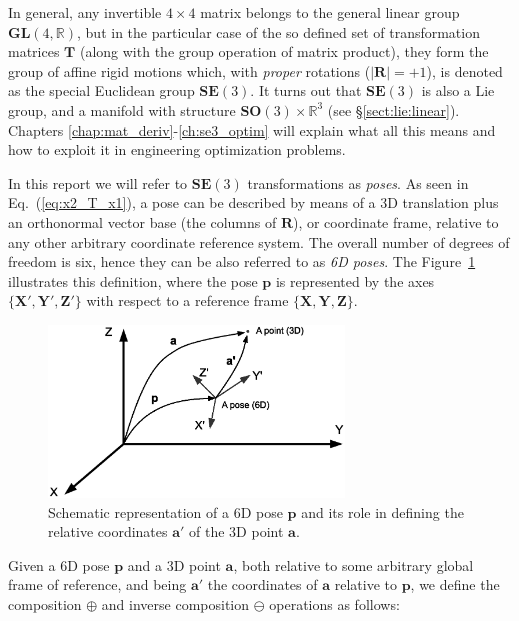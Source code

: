 \documentclass[a4paper,11pt]{report}
\begin{document}
In general, any invertible $4 \times 4$ matrix belongs to the 
general linear group $\mathbf{GL}(4,\mathbb{R})$, but in the particular case of 
the so defined set of transformation matrices $\mathbf{T}$ 
(along with the group operation of matrix product), 
they form the group of affine rigid motions which, with \emph{proper} rotations 
($|\mathbf{R}|=+1$), is denoted as the special Euclidean group $\mathbf{SE}(3)$.
It turns out that $\mathbf{SE}(3)$ is also a Lie group, and 
a manifold with structure $\mathbf{SO}(3) \times \mathbb{R}^3$ (see \S\ref{sect:lie:linear}). 
Chapters \ref{chap:mat_deriv}-\ref{ch:se3_optim} will explain 
what all this means and how to exploit it in engineering optimization problems.

In this report we will refer to $\mathbf{SE}(3)$ transformations as \emph{poses}.
As seen in Eq.~(\ref{eq:x2_T_x1}), a pose can be described by means of a 3D translation 
plus an orthonormal vector base (the columns of $\mathbf{R}$), 
or coordinate frame, relative to any other arbitrary coordinate reference system. 
The overall number of degrees of freedom is six, hence they can be also referred 
to as \emph{6D poses}.
The Figure~\ref{fig:1} illustrates this definition, where the pose $\mathbf{p}$ is represented
by the axes $\{\mathbf{X}',\mathbf{Y}',\mathbf{Z}' \}$ with respect to a reference frame 
$\{\mathbf{X},\mathbf{Y},\mathbf{Z} \}$.


\begin{figure}[h!]
\centering
\includegraphics[width=0.70\textwidth]{fig_pose_composition.eps}
\caption{Schematic representation of a 6D pose $\mathbf{p}$ and its role in defining 
the relative coordinates $\mathbf{a}'$ of the 3D point $\mathbf{a}$.}
\label{fig:1}
\end{figure}


Given a 6D pose $\mathbf{p}$ and a 3D point $\mathbf{a}$, both relative to some arbitrary
global frame of reference, and being $\mathbf{a}'$ the coordinates of $\mathbf{a}$ relative
to $\mathbf{p}$, we define 
the composition $\oplus$ and inverse composition $\ominus$ operations as follows:
\end{document}
